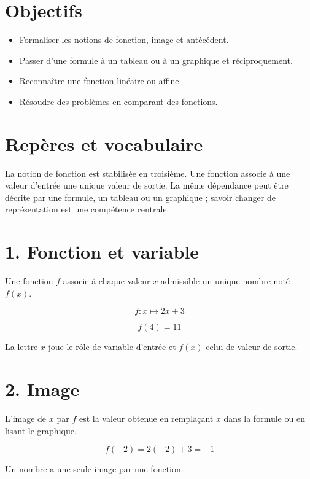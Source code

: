 
\section{Objectifs}
\begin{itemize}
\item Formaliser les notions de fonction, image et antécédent.
\item Passer d’une formule à un tableau ou à un graphique et réciproquement.
\item Reconnaître une fonction linéaire ou affine.
\item Résoudre des problèmes en comparant des fonctions.
\end{itemize}

\section{Repères et vocabulaire}
La notion de fonction est stabilisée en troisième. Une fonction associe à une valeur d’entrée une unique valeur de sortie. La même dépendance peut être décrite par une formule, un tableau ou un graphique ; savoir changer de représentation est une compétence centrale.

\section{1. Fonction et variable}
Une fonction $f$ associe à chaque valeur $x$ admissible un unique nombre noté $f(x)$.

\[
f:x\mapsto2x+3
\]

\[
f(4)=11
\]

\begin{exemple}
La lettre $x$ joue le rôle de variable d’entrée et $f(x)$ celui de valeur de sortie.
\end{exemple}

\section{2. Image}
L’image de $x$ par $f$ est la valeur obtenue en remplaçant $x$ dans la formule ou en lisant le graphique.

\[
f(-2)=2(-2)+3=-1
\]

\begin{exemple}
Un nombre a une seule image par une fonction.
\end{exemple}

